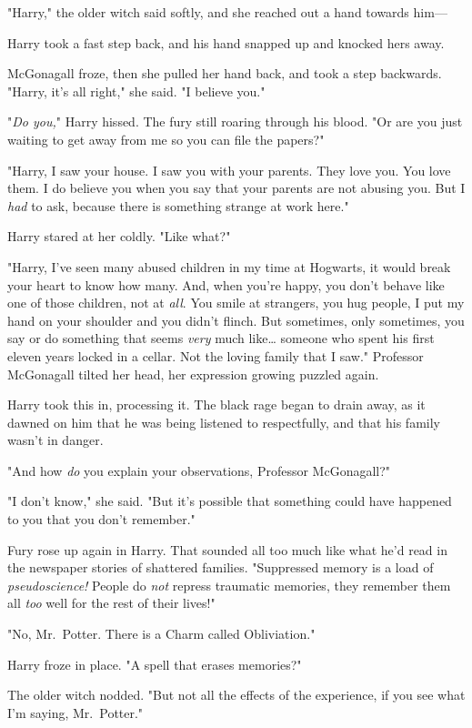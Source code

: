 "Harry," the older witch said softly, and she reached out a hand towards him---

Harry took a fast step back, and his hand snapped up and knocked hers away.

McGonagall froze, then she pulled her hand back, and took a step backwards. 
"Harry, it's all right," she said. "I believe you."

"\emph{Do you,}" Harry hissed. The fury still roaring through his blood. "Or 
are you just waiting to get away from me so you can file the papers?"

"Harry, I saw your house. I saw you with your parents. They love you. You love 
them. I do believe you when you say that your parents are not abusing you. But 
I \emph{had} to ask, because there is something strange at work here."

Harry stared at her coldly. "Like what?"

"Harry, I've seen many abused children in my time at Hogwarts, it would break 
your heart to know how many. And, when you're happy, you don't behave like one 
of those children, not at \emph{all}. You smile at strangers, you hug people, I 
put my hand on your shoulder and you didn't flinch. But sometimes, only 
sometimes, you say or do something that seems \emph{very} much like{\ldots} 
someone who spent his first eleven years locked in a cellar. Not the loving 
family that I saw." Professor McGonagall tilted her head, her expression 
growing puzzled again.

Harry took this in, processing it. The black rage began to drain away, as it 
dawned on him that he was being listened to respectfully, and that his family 
wasn't in danger.

"And how \emph{do} you explain your observations, Professor McGonagall?"

"I don't know," she said. "But it's possible that something could have happened 
to you that you don't remember."

Fury rose up again in Harry. That sounded all too much like what he'd read in 
the newspaper stories of shattered families. "Suppressed memory is a load of 
\emph{pseudoscience!} People do \emph{not} repress traumatic memories, they 
remember them all \emph{too} well for the rest of their lives!"

"No, Mr.~Potter. There is a Charm called Obliviation."

Harry froze in place. "A spell that erases memories?"

The older witch nodded. "But not all the effects of the experience, if you see 
what I'm saying, Mr.~Potter."

